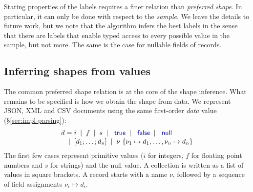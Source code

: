 \documentclass[10pt,preprint,blind,clearpagebib]{sigplanconf}
\newcommand{\kvd}[1]{\textnormal{\textcolor{kvdclr}{\sffamily #1}}}
\newcommand{\lsep}[0]{\;\; | \;\;}
\newcommand{\narrow}[1]{\hspace{-0.7em} #1 \hspace{-0.7em}}
\begin{document}
Stating properties of the labels requires a finer relation than \emph{preferred shape}. In particular, 
it can only be done with respect to the \emph{sample}. We leave the details to future work, but we
note that the algorithm infers the best labels in the sense that there are labels that enable 
typed access to every possible value in the sample, but not more. The same is the case for nullable
fields of records.

\subsection{Inferring shapes from values}
\label{sec:formal-inferval}

The common preferred shape relation is at the core of the shape inference. What remains to be 
specified is how we obtain the shape from data. We represent JSON, XML and CSV documents using
the same first-order \emph{data} value (\S\ref{sec:impl-parsing}):
%
\begin{equation*}
\begin{array}{lcl}
 d &\narrow{=}& i \lsep f \lsep s \lsep \kvd{true} \lsep \kvd{false} \lsep \kvd{null} \\[0.1em]
   &\narrow{|}& [d_1; \ldots; d_n] \lsep \nu~\{ \nu_1 \mapsto d_1, \ldots, \nu_n \mapsto d_n \}
\end{array}
\end{equation*}
%
The first few cases represent primitive values ($i$ for integers, $f$ for floating
point numbers and $s$ for strings) and the \kvd{null} value. A collection is written as a 
list of values in square brackets. A record starts with a name $\nu$, followed by a 
sequence of field assignments $\nu_i \mapsto d_i$.
\end{document}
